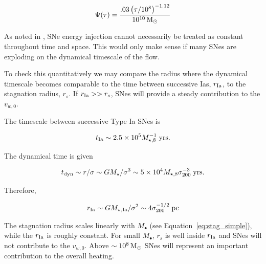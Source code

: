 \documentclass[usenatbib,fleqn]{mn2e}
\newcommand\gsim{\mathrel{\rlap{\lower4pt\hbox{\hskip1pt$\sim$}}
    \raise1pt\hbox{$>$}}}
\newcommand{\rs}{r_s}
\newcommand{\Mstar}{M_{\star}}
\newcommand{\Mseight}{M_{\star,8}}
\newcommand{\Mbh}[1][]{M_{\bullet#1}}
\newcommand{\rIa}{r_{\rm Ia}}
\newcommand{\vwO}{v_{w,0}}
\begin{document}
\begin{enumerate}
  \begin{align}
    \Psi(\tau)=\frac{.03
      \left(\tau/10^8\right)^{-1.12}}{10^{10} \,{\rm M_\odot}}
  \end{align}
  


  As noted in \citealt{ShcherbakovWong+:2014a}, SNe energy injection
  cannot necessarily be treated as constant throughout time and
  space. This would only make sense if many SNes are exploding on the
  dynamical timescale of the flow.

  To check this quantitatively we may compare the radius where the
  dynamical timescale becomes comparable to the time between successive
  Ias, $\rIa$, to the stagnation radius, $\rs$. If $\rIa>>\rs$, SNes
  will provide a steady contribution to the $\vwO$. 

  The timescale between successive Type Ia SNes is

  \begin{align}
    t_{\rm Ia} \sim 2.5 \times 10^5 \Mseight^{-1} \; {\rm yrs}.
  \end{align}

  The dynamical time is given

  \begin{align}
    t_{\rm dyn} \sim r/\sigma \sim G \Mstar/\sigma^3 \sim 5 \times 10^4
    \Mseight \sigma_{200}^{-3} \; {\rm yrs}.
  \end{align}

  Therefore,

  \begin{align}
    r_{\rm Ia} \sim G \Mstar{}_{,\rm Ia}/\sigma^2 \sim 4
    \sigma_{200}^{-1/2} \; {\rm pc}
  \end{align}

  The stagnation radius scales linearly with $\Mbh$ (see
  Equation~\ref{eq:stag_simple}), while the $\rIa$ is roughly
  constant. For small $\Mbh$, $\rs$ is well inside $\rIa$ and SNes will
  not contribute to the $\vwO$.  Above $\sim10^8 \,{\rm M_\odot}$ SNes will
  represent an important contribution to the overall heating.


\end{enumerate}
\end{document}
